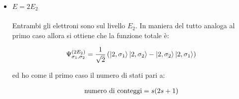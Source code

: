 \begin{itemize}
		Dato che $n=1$ è diverso da $n=2$, i due stati completi sono sempre diversi, indipendentemente dallo spin!
Anche se gli spin fossero identici ($\sigma_1 = \sigma_2$), le particelle non sarebbero nello stesso stato perché una è al "piano terra" e l'altra al "primo piano". Poiché non c'è nessun vincolo che lega lo spin del primo a quello del secondo, abbiamo la massima libertà di scelta:
	\begin{itemize}
		\item Scelta per l'elettrone su $E_1$: Può avere qualsiasi orientazione di spin. Quante opzioni ci sono? $2s+1$.
		\item Scelta per l'elettrone su $E_2$: Può avere, indipendentemente dall'altro, qualsiasi spin. Quante opzioni ci sono? $2s+1$.
	\end{itemize}
	
		Il numero totale di combinazioni è semplicemente il prodotto delle possibilità:
	\begin{align*}
		\text{numero di conteggi} = \qty(2s + 1)\qty(2s + 1) = \qty(2s + 1)^2
	\end{align*}
	
		La funzione d'onda infine è:
	\begin{align*}
		\Psi_{\sigma_1, \sigma_2}^{\qty(E_1 + E_2)} = \frac{1}{\sqrt{2}} \, \qty(\ket{1, \sigma_1} \ket{2, \sigma_2} - \ket{2, \sigma_2} \ket{1, \sigma_1})
	\end{align*}
	
		Questa formula costruisce automaticamente uno stato antisimmetrico valido per qualsiasi coppia di valori $\sigma_1$ e $\sigma_2$, proprio perché i ket $\ket{1}$ e $\ket{2}$ sono diversi.

	\item $E = 2 E_2$
	\\
	\\
		Entrambi gli elettroni sono sul livello $E_2$. In maniera del tutto analoga al primo caso allora si ottiene che la funzione totale è:
		
	\begin{align*}
		\Psi_{\sigma_1, \sigma_2}^{\qty(2E_2)} = \frac{1}{\sqrt{2}} \, \qty(\ket{2, \sigma_1} \ket{2, \sigma_2} - \ket{2, \sigma_2} \ket{2, \sigma_1})
	\end{align*}
	
		ed ho come il primo caso il numero di stati pari a:
		
	\begin{align*}
		\text{numero di conteggi} = s \qty(2s +1 )
	\end{align*}
	
\end{itemize}

